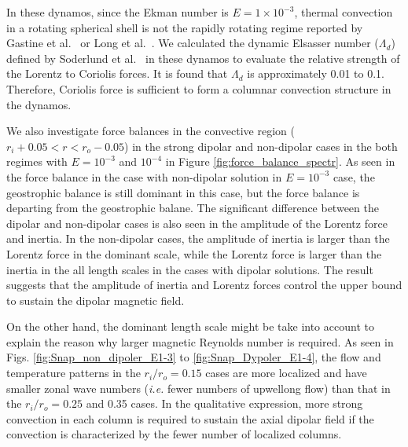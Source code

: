 {\color{red}
In these dynamos, since the Ekman number is $E = 1 \times 10^{-3}$, thermal convection in a rotating spherical shell is not the rapidly rotating regime reported by Gastine et al.\   or Long et al.\ . 
We calculated the dynamic Elsasser number ($\Lambda_d$) defined by Soderlund et al.\  in these dynamos to evaluate the relative strength of the Lorentz to Coriolis forces. 
It is found that $\Lambda_d$ is approximately 0.01 to 0.1. 
Therefore, Coriolis force is sufficient to form a columnar convection structure in the dynamos.
}
{\color{blue}
We also investigate force balances in the convective region ($r_{i} + 0.05 < r < r_{o} - 0.05$) in the strong dipolar and non-dipolar cases in the both regimes with $E = 10^{-3}$ and $10^{-4}$ in Figure \ref{fig:force_balance_spectr}. As seen in the force balance in the case with non-dipolar solution in $E = 10^{-3}$ case, the geostrophic balance is still dominant in this case, but the force balance is departing from the geostrophic balane.  The significant difference between the dipolar and non-dipolar cases is also seen in the amplitude of the Lorentz force and inertia. In the non-dipolar cases, the amplitude of inertia is larger than the Lorentz force in the dominant scale, while the Lorentz force is larger than the inertia in the all length scales in the cases with dipolar solutions. The result suggests that the amplitude of inertia and Lorentz forces control the upper bound to sustain the dipolar magnetic field.

On the other hand, the dominant length scale might be take into account to explain the reason why larger magnetic Reynolds number is required. As seen in Figs. \ref{fig:Snap_non_dipoler_E1-3} to \ref{fig:Snap_Dypoler_E1-4}, the flow and temperature patterns in the  $r_i/r_o  = 0.15$ cases are more localized and have smaller zonal wave numbers ({\it i.e.} fewer numbers of upwellong flow) than that in the $r_i/r_o  = 0.25$ and 0.35 cases. In the qualitative expression, more strong convection in each column is required to sustain the axial dipolar field if the convection is characterized by the fewer number of localized columns.
}

